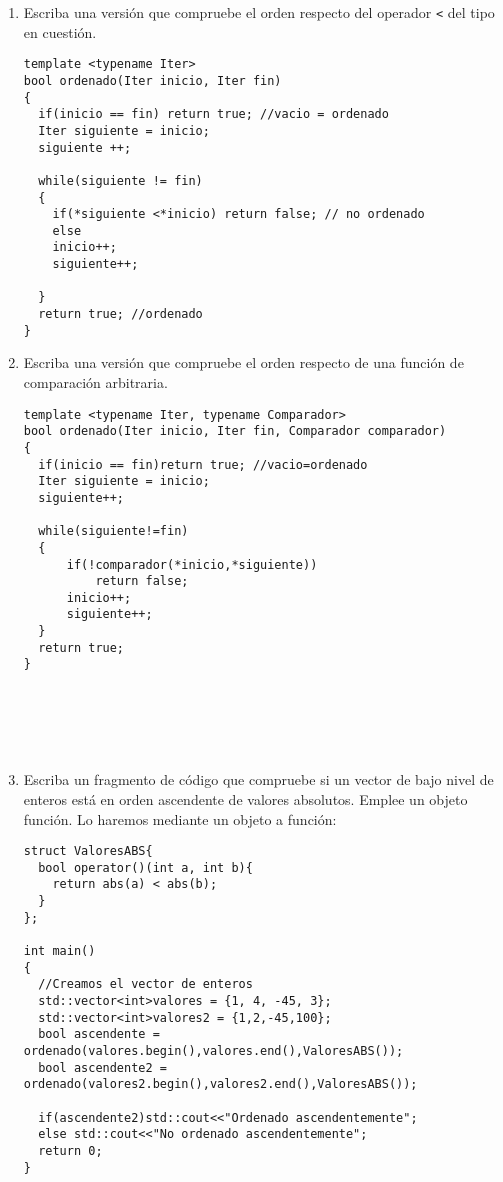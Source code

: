 \begin{enumerate}[label=\alph*)]
  \item Escriba una versión que compruebe el orden respecto del operador \texttt{<} del tipo en cuestión.
\begin{verbatim}
template <typename Iter>
bool ordenado(Iter inicio, Iter fin)
{
  if(inicio == fin) return true; //vacio = ordenado
  Iter siguiente = inicio;
  siguiente ++;

  while(siguiente != fin)
  {
    if(*siguiente <*inicio) return false; // no ordenado
    else
    inicio++;
    siguiente++;
      
  }
  return true; //ordenado
}
  \end{verbatim}
  \item Escriba una versión que compruebe el orden respecto de una función de comparación arbitraria.
\begin{verbatim}
template <typename Iter, typename Comparador>
bool ordenado(Iter inicio, Iter fin, Comparador comparador)
{
  if(inicio == fin)return true; //vacio=ordenado
  Iter siguiente = inicio;
  siguiente++;

  while(siguiente!=fin)
  {
      if(!comparador(*inicio,*siguiente))
          return false;
      inicio++;
      siguiente++;
  }
  return true;
}






\end{verbatim}
  \item Escriba un fragmento de código que compruebe si un vector de bajo nivel de enteros está en orden ascendente de valores absolutos. Emplee un objeto función.
Lo haremos mediante un objeto a función:
\begin{verbatim}
struct ValoresABS{
  bool operator()(int a, int b){
    return abs(a) < abs(b);
  }
};

int main()
{
  //Creamos el vector de enteros
  std::vector<int>valores = {1, 4, -45, 3};
  std::vector<int>valores2 = {1,2,-45,100};
  bool ascendente = ordenado(valores.begin(),valores.end(),ValoresABS());
  bool ascendente2 = ordenado(valores2.begin(),valores2.end(),ValoresABS());

  if(ascendente2)std::cout<<"Ordenado ascendentemente";
  else std::cout<<"No ordenado ascendentemente";
  return 0;
}
\end{verbatim}
\end{enumerate}




